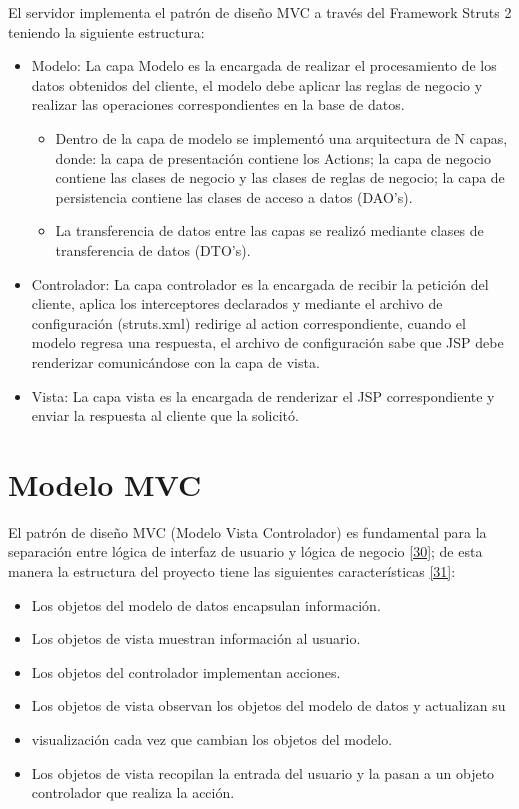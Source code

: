 El servidor implementa el patrón de diseño MVC a través del Framework Struts 2 teniendo la siguiente estructura:
\begin{itemize}
	\item Modelo: La capa Modelo es la encargada de realizar el procesamiento de los datos obtenidos del cliente, el modelo debe aplicar las reglas de negocio y realizar las operaciones correspondientes en la base de datos.\\
	
	\begin{itemize}
	
	\item Dentro de la capa de modelo se implementó una arquitectura de N capas, donde: la capa de presentación contiene los Actions; la capa de negocio contiene las clases de negocio y las clases de reglas de negocio; la capa de persistencia contiene las clases de acceso a datos (DAO’s).\\
	
	\item La transferencia de datos entre las capas se realizó mediante clases de transferencia de datos (DTO’s).
	
	\end{itemize}
	
	\item Controlador: La capa controlador es la encargada de recibir la petición del cliente, aplica los interceptores declarados y mediante el archivo de configuración (struts.xml) redirige al action correspondiente, cuando el modelo regresa una respuesta, el archivo de configuración sabe que JSP debe renderizar comunicándose con la capa de vista.
	
	\item Vista: La capa vista es la encargada de renderizar el JSP correspondiente y enviar la respuesta al cliente que la solicitó.
\end{itemize}


\section{Modelo MVC}
El patrón de diseño MVC (Modelo Vista Controlador) es fundamental para la separación entre lógica de interfaz de usuario y lógica de negocio \hyperlink{b30}{[30]}; de esta manera la estructura del proyecto tiene las siguientes características \hyperlink{b31}{[31]}:

\begin{itemize}
	\item Los objetos del modelo de datos encapsulan información.
	\item Los objetos de vista muestran información al usuario.
	\item Los objetos del controlador implementan acciones.
	\item Los objetos de vista observan los objetos del modelo de datos y actualizan su \item visualización cada vez que cambian los objetos del modelo.
	\item Los objetos de vista recopilan la entrada del usuario y la pasan a un objeto controlador que realiza la acción. 
\end{itemize}

